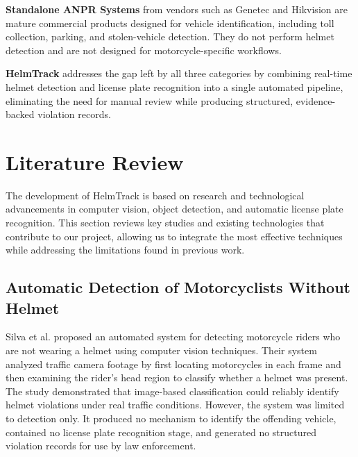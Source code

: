 \textbf{Standalone ANPR Systems} from vendors such as Genetec and Hikvision are mature commercial products designed for vehicle identification, including toll collection, parking, and stolen-vehicle detection. They do not perform helmet detection and are not designed for motorcycle-specific workflows.

\textbf{HelmTrack} addresses the gap left by all three categories by combining real-time helmet detection and license plate recognition into a single automated pipeline, eliminating the need for manual review while producing structured, evidence-backed violation records.

\section{Literature Review}
\label{section:literature-review}

The development of HelmTrack is based on research and technological advancements in computer vision, object detection, and automatic license plate recognition. This section reviews key studies and existing technologies that contribute to our project, allowing us to integrate the most effective techniques while addressing the limitations found in previous work.

\subsection{Automatic Detection of Motorcyclists Without Helmet}
\begin{subsecbody}
Silva et al. \cite{paper:helmet-detection} proposed an automated system for detecting motorcycle riders who are not wearing a helmet using computer vision techniques. Their system analyzed traffic camera footage by first locating motorcycles in each frame and then examining the rider's head region to classify whether a helmet was present. The study demonstrated that image-based classification could reliably identify helmet violations under real traffic conditions. However, the system was limited to detection only. It produced no mechanism to identify the offending vehicle, contained no license plate recognition stage, and generated no structured violation records for use by law enforcement.
\end{subsecbody}

